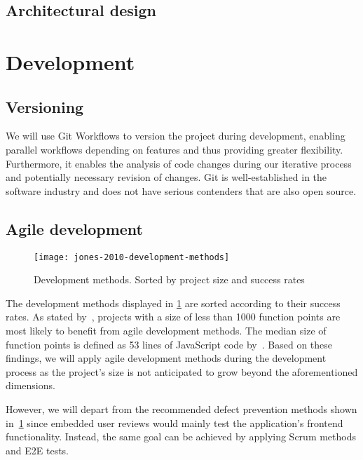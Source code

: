 \subsection{Architectural design}\label{subsec:architectural-design}


\section{Development}\label{sec:development}

\subsection{Versioning}\label{subsec:versioning}

We will use Git Workflows to version the project during development, enabling parallel workflows depending on features and thus providing greater flexibility.
Furthermore, it enables the analysis of code changes during our iterative process and potentially necessary revision of changes.
Git is well-established in the software industry and does not have serious contenders that are also open source.

\subsection{Agile development}\label{subsec:agile-development}

\begin{figure}
    \centering
    \texttt{[image: jones-2010-development-methods]}
    \caption[Development mehtods]{Development methods. Sorted by project size and success rates~\autocite[11]{jones_software_2010}}
    \label{fig:development-methods}
\end{figure}

The development methods displayed in \cref{fig:development-methods} are sorted according to their success rates.
As stated by~\textcite[10-12]{jones_software_2010}, projects with a size of less than 1000 function points are most likely to benefit from agile development methods.
The median size of function points is defined as 53 lines of JavaScript code by~\textcite{qsm_function_2009}.
Based on these findings, we will apply agile development methods during the development process as the project's size is not anticipated to grow beyond the aforementioned dimensions.

However, we will depart from the recommended defect prevention methods shown in~\cref{fig:development-methods} since embedded user reviews would mainly test the application’s frontend functionality.
Instead, the same goal can be achieved by applying Scrum methods and \gls{E2E} tests.

